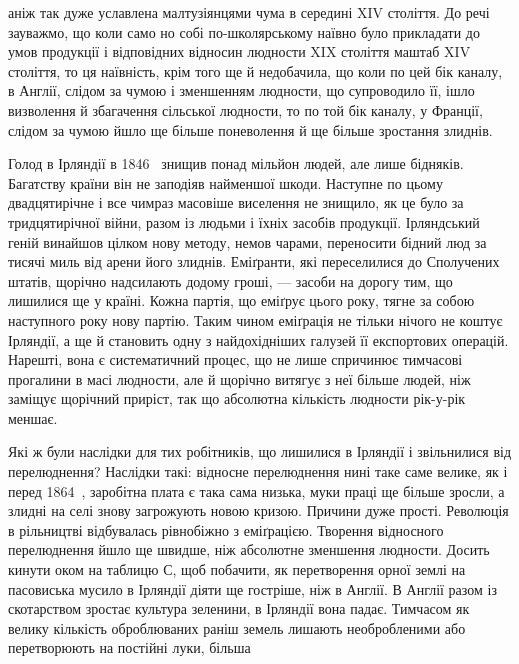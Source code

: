 \parcont{}  %
аніж так дуже уславлена малтузіянцями чума в середині
XIV століття. До речі зауважмо, що коли само но собі по-школярському
наївно було прикладати до умов продукції і відповідних
відносин людности XIX століття маштаб XIV століття,
то ця наївність, крім того ще й недобачила, що коли
по цей бік каналу, в Англії, слідом за чумою і зменшенням
людности, що супроводило її, ішло визволення й збагачення
сільської людности, то по той бік каналу, у Франції, слідом за
чумою йшло ще більше поневолення й ще більше зростання
злиднів.

Голод в Ірляндії в 1846~ знищив понад мільйон людей, але
лише бідняків. Багатству країни він не заподіяв найменшої
шкоди. Наступне по цьому двадцятирічне і все чимраз масовіше
виселення не знищило, як це було за тридцятирічної війни,
разом із людьми і їхніх засобів продукції. Ірляндський геній
винайшов цілком нову методу, немов чарами, переносити бідний
люд за тисячі миль від арени його злиднів. Еміґранти, які переселилися
до Сполучених штатів, щорічно надсилають додому гроші,
— засоби на дорогу тим, що лишилися ще у країні. Кожна
партія, що еміґрує цього року, тягне за собою наступного року
нову партію. Таким чином еміґрація не тільки нічого не коштує
Ірляндії, а ще й становить одну з найдохідніших галузей її експортових
операцій. Нарешті, вона є систематичний процес, що
не лише спричинює тимчасові прогалини в масі людности, але
й щорічно витягує з неї більше людей, ніж заміщує щорічний
приріст, так що абсолютна кількість людности рік-у-рік
меншає.

Які ж були наслідки для тих робітників, що лишилися в Ірляндії
і звільнилися від перелюднення? Наслідки такі: відносне
перелюднення нині таке саме велике, як і перед 1864~, заробітна
плата є така сама низька, муки праці ще більше зросли, а злидні
на селі знову загрожують новою кризою. Причини дуже прості.
Революція в рільництві відбувалась рівнобіжно з еміґрацією.
Творення відносного перелюднення йшло ще швидше, ніж абсолютне
зменшення людности. Досить кинути оком на таблицю
$С$, щоб побачити, як перетворення орної землі на пасовиська
мусило в Ірляндії діяти ще гостріше, ніж в Англії. В Англії разом
із скотарством зростає культура зеленини, в Ірляндії вона падає.
Тимчасом як велику кількість оброблюваних раніш земель лишають
необробленими або перетворюють на постійні луки, більша
\parbreak{}  %
